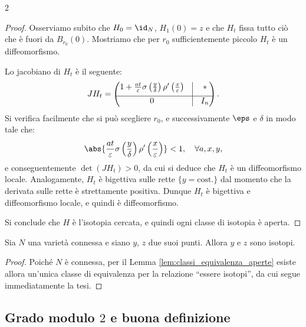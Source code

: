 \begin{multicols*}{2}
\begin{proof}
        Osserviamo subito che $H_0 = \id_N$, $H_1(0) = z$ e che $H_t$ fissa tutto ciò che è fuori
        da $B_{r_0}(0)$. Mostriamo che per $r_0$ sufficientemente piccolo $H_t$ è un diffeomorfismo. \smallskip

        Lo jacobiano di $H_t$ è il seguente:
        \[
            J H_t = \begin{pmatrix}
                1 + \frac{a t}{\varepsilon} \sigma\left(\frac{y}{\delta}\right) \rho'\left(\frac{x}{\varepsilon}\right) & \vline & *   \\[0.06in]
                \hline
                0                                                                                                       & \vline & I_n
            \end{pmatrix}.
        \]
        Si verifica facilmente che si può scegliere $r_0$, e successivamente $\eps$ e $\delta$ in modo tale che:
        \[
            \abs{\frac{a t}{\varepsilon} \sigma\left(\frac{y}{\delta}\right) \rho'\left(\frac{x}{\varepsilon}\right)} < 1, \quad \forall a, x, y,
        \]
        e conseguentemente $\det(J H_t) > 0$, da cui si deduce che $H_t$ è un diffeomorfismo locale. Analogamente, $H_t$ è
        bigettiva sulle rette $\{y = \text{cost.}\}$ dal momento che la derivata sulle rette è strettamente
        positiva. Dunque $H_t$ è bigettiva e diffeomorfismo locale, e quindi è diffeomorfismo. \smallskip

        Si conclude che $H$ è l'isotopia cercata, e quindi ogni classe di isotopia è aperta.
    \end{proof}

    \begin{lemma}[di omogeneità] \label{lem:omogeneità}
        Sia $N$ una varietà connessa e siano $y$, $z$ due suoi punti. Allora
        $y$ e $z$ sono isotopi.
    \end{lemma}

    \begin{proof}
        Poiché $N$ è connessa, per il Lemma \ref{lem:classi_equivalenza_aperte} esiste
        allora un'unica classe di equivalenza per la relazione ``essere isotopi'', da
        cui segue immediatamente la tesi.
    \end{proof}

    \subsection{Grado modulo \texorpdfstring{$2$}{2} e buona definizione}


\end{multicols*}
